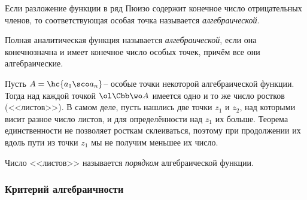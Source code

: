\documentclass[a4paper]{article}
\begin{document}
\begin{df}
Если разложение функции в ряд Пюизо содержит конечное число отрицательных членов, то
соответствующая особая точка называется \emph{алгебраической}.
\end{df}

\begin{df}
Полная аналитическая функция называется \emph{алгебраической}, если она конечнозначна и имеет конечное число
особых точек, причём все они алгебраические.
\end{df}

Пусть $A = \hc{a_1\sco a_n}$-- особые точки некоторой алгебраической функции. Тогда над каждой точкой $\ol\Cbb\wo A$ имеется
одно и то же число ростков (<<листов>>). В самом деле, пусть нашлись две точки $z_1$ и $z_2$, над которыми висит
разное число листов, и для определённости над $z_1$ их больше. Теорема единственности не позволяет росткам склеиваться,
поэтому при продолжении их вдоль пути из точки $z_1$ мы не получим меньшее их число.

\begin{df}
Число <<листов>> называется \emph{порядком} алгебраической функции.
\end{df}

\subsubsection{Критерий алгебраичности}
\end{document}
